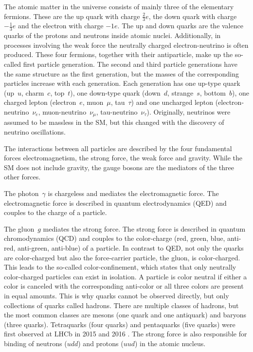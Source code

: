 The atomic matter in the universe consists of mainly three of the elementary fermions. 
These are the up quark with charge $\frac{2}{3}e$, the down quark with charge $-\frac{1}{3}e$ and the electron with charge $-1e$.
The up and down quarks are the valence quarks of the protons and neutrons inside atomic nuclei.
Additionally, in processes involving the weak force the neutrally charged electron-neutrino is often produced.
These four fermions, together with their antiparticle, make up the so-called first particle generation.
The second and third particle generations have the same structure as the first generation, but the masses of the corresponding particles increase with each generation.
Each generation has one up-type quark (up~$u$, charm~$c$, top~$t$), one down-type quark (down~$d$, strange~$s$, bottom~$b$), one charged lepton (electron~$e$, muon~$\mu$, tau~$\tau$) and one uncharged lepton (electron-neutrino~$\nu_e$, muon-neutrino~$\nu_\mu$, tau-neutrino~$\nu_\tau$).
Originally, neutrinos were assumed to be massless in the SM, but this changed with the discovery of neutrino oscillations. \cite{NeutrinoMassSK,NeutrinoMassSNO}

The interactions between all particles are described by the four fundamental forces electromagnetism, the strong force, the weak force and gravity.
While the SM does not include gravity, the gauge bosons are the mediators of the three other forces.

The photon~$\gamma$ is chargeless and mediates the electromagnetic force.
The electromagnetic force is described in quantum electrodynamics (QED) and couples to the charge of a particle.

The gluon~$g$ mediates the strong force.
The strong force is described in quantum chromodynamics (QCD) and couples to the color-charge (red, green, blue, anti-red, anti-green, anti-blue) of a particle.
In contrast to QED, not only the quarks are color-charged but also the force-carrier particle, the gluon, is color-charged.
This leads to the so-called color-confinement, which states that only neutrally color-charged particles can exist in isolation.
A particle is color neutral if either a color is canceled with the corresponding anti-color or all three colors are present in equal amounts.
This is why quarks cannot be observed directly, but only collections of quarks called hadrons.
There are multiple classes of hadrons, but the most common classes are mesons (one quark and one antiquark) and baryons (three quarks).
Tetraquarks (four quarks) and pentaquarks (five quarks) were first observed at LHCb in 2015 and 2016 \cite{TetraquarkLHCb,PentaquarkLHCb}. 
The strong force is also responsible for binding of neutrons ($udd$) and protons ($uud$) in the atomic nucleus.

